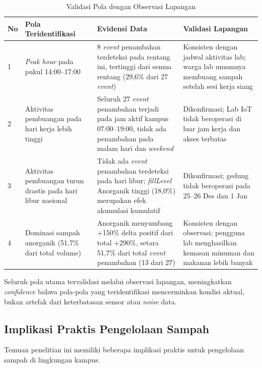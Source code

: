 \begin{table}[H]
  \caption{Validasi Pola dengan Observasi Lapangan}
  \label{tab:validasi-pola}
  \begin{tabularx}{\textwidth}{| l | X | X | X |}
    \hline
    \textbf{No} & \textbf{Pola Teridentifikasi} & \textbf{Evidensi Data} & \textbf{Validasi Lapangan} \\
    \hline
    1 & \textit{Peak hour} pada pukul 14:00--17:00 & 8 \textit{event} penambahan terdeteksi pada rentang ini, tertinggi dari semua rentang (29,6\% dari 27 \textit{event}) & Konsisten dengan jadwal aktivitas lab; warga lab umumnya membuang sampah setelah sesi kerja siang \\
    \hline
    2 & Aktivitas pembuangan pada hari kerja lebih tinggi & Seluruh 27 \textit{event} penambahan terjadi pada jam aktif kampus 07:00--19:00, tidak ada penambahan pada malam hari dan \textit{weekend} & Dikonfirmasi; Lab IoT tidak beroperasi di luar jam kerja dan akses terbatas \\
    \hline
    3 & Aktivitas pembuangan turun drastis pada hari libur nasional & Tidak ada \textit{event} penambahan terdeteksi pada hari libur; \textit{fillLevel} Anorganik tinggi (18,0\%) merupakan efek akumulasi kumulatif & Dikonfirmasi; gedung tidak beroperasi pada 25--26 Des dan 1 Jan \\
    \hline
    4 & Dominasi sampah anorganik (51,7\% dari total volume) & Anorganik menyumbang +150\% delta positif dari total +290\%, setara 51,7\% dari total \textit{event} penambahan (13 dari 27) & Konsisten dengan observasi; pengguna lab menghasilkan kemasan minuman dan makanan lebih banyak \\
    \hline
  \end{tabularx}
\end{table}

Seluruh pola utama tervalidasi melalui observasi lapangan, meningkatkan \textit{confidence} bahwa pola-pola yang teridentifikasi mencerminkan kondisi aktual, bukan artefak dari keterbatasan sensor atau \textit{noise} data.

\subsection{Implikasi Praktis Pengelolaan Sampah}

Temuan penelitian ini memiliki beberapa implikasi praktis untuk pengelolaan sampah di lingkungan kampus.

